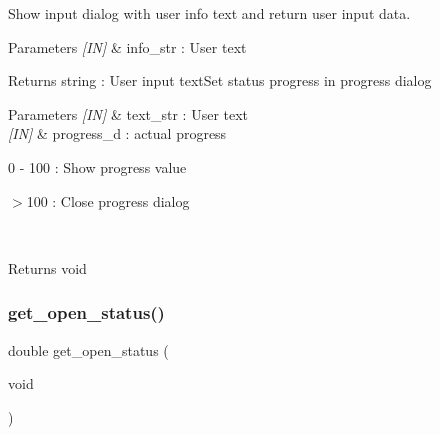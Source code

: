 Show input dialog with user info text and return user input data. 


\begin{DoxyCode}{0}
\end{DoxyCode}



\begin{DoxyParams}{Parameters}
{\em \mbox{[}\+I\+N\mbox{]}} & info\+\_\+str \+: User text \\
\hline
\end{DoxyParams}
\begin{DoxyReturn}{Returns}
string \+: User input text\+Set status progress in progress dialog
\end{DoxyReturn}

\begin{DoxyCode}{0}
\DoxyCodeLine{\textcolor{comment}{// Show 50\% progress}}
\DoxyCodeLine{\textcolor{comment}{// Close dialog}}
\end{DoxyCode}



\begin{DoxyParams}{Parameters}
{\em \mbox{[}\+I\+N\mbox{]}} & text\+\_\+str \+: User text \\
\hline
{\em \mbox{[}\+I\+N\mbox{]}} & progress\+\_\+d \+: actual progress \begin{DoxyItemize}
\item 0 -\/ 100 \+: Show progress value \item $>$100 \+: Close progress dialog \end{DoxyItemize}
\\
\hline
\end{DoxyParams}
\begin{DoxyReturn}{Returns}
void 
\end{DoxyReturn}
\mbox{\label{classmain__frame_aefe5b38f87e41cd0a2cbf8405b6c3cc1}} 
\subsubsection{get\_open\_status()}
{\footnotesize\ttfamily double get\+\_\+open\+\_\+status (\begin{DoxyParamCaption}\item[{void}]{ }\end{DoxyParamCaption})}



